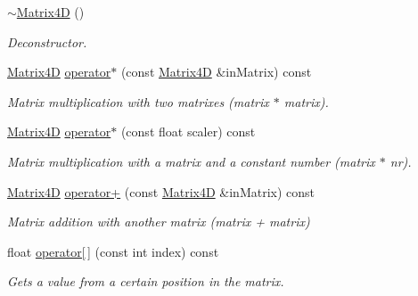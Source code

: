 \begin{DoxyCompactItemize}
\mbox{\label{class_matrix4_d_a90b64981f087dfcb496b8f5a0449803c}} 
\mbox{\hyperlink{class_matrix4_d_a90b64981f087dfcb496b8f5a0449803c}{$\sim$\+Matrix4D}} ()
\begin{DoxyCompactList}\small\item\em Deconstructor. \end{DoxyCompactList}\item 
\mbox{\label{class_matrix4_d_ae6c90e5c3cdacd80d8ad9e5a90bf23b0}} 
\mbox{\hyperlink{class_matrix4_d}{Matrix4D}} \mbox{\hyperlink{class_matrix4_d_ae6c90e5c3cdacd80d8ad9e5a90bf23b0}{operator$\ast$}} (const \mbox{\hyperlink{class_matrix4_d}{Matrix4D}} \&in\+Matrix) const
\begin{DoxyCompactList}\small\item\em Matrix multiplication with two matrixes (matrix $\ast$ matrix). \end{DoxyCompactList}\item 
\mbox{\label{class_matrix4_d_a835619882a8ef9ba8f93c18227b34516}} 
\mbox{\hyperlink{class_matrix4_d}{Matrix4D}} \mbox{\hyperlink{class_matrix4_d_a835619882a8ef9ba8f93c18227b34516}{operator$\ast$}} (const float scaler) const
\begin{DoxyCompactList}\small\item\em Matrix multiplication with a matrix and a constant number (matrix $\ast$ nr). \end{DoxyCompactList}\item 
\mbox{\label{class_matrix4_d_ae218dffc373ba9a38bb0ede7dcde8f60}} 
\mbox{\hyperlink{class_matrix4_d}{Matrix4D}} \mbox{\hyperlink{class_matrix4_d_ae218dffc373ba9a38bb0ede7dcde8f60}{operator+}} (const \mbox{\hyperlink{class_matrix4_d}{Matrix4D}} \&in\+Matrix) const
\begin{DoxyCompactList}\small\item\em Matrix addition with another matrix (matrix + matrix) \end{DoxyCompactList}\item 
\mbox{\label{class_matrix4_d_a7732308186a5873d8f9c08e6b535e0df}} 
float \mbox{\hyperlink{class_matrix4_d_a7732308186a5873d8f9c08e6b535e0df}{operator\mbox{[}$\,$\mbox{]}}} (const int index) const
\begin{DoxyCompactList}\small\item\em Gets a value from a certain position in the matrix. \end{DoxyCompactList}\item 

\end{DoxyCompactItemize}
